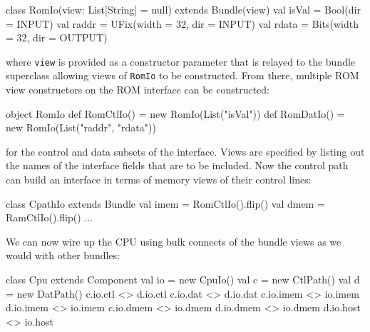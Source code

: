 \documentclass[twocolumn,10pt]{article}
\begin{document}
\begin{scala}
class RomIo(view: List[String] = null) extends Bundle(view) {
  val isVal = Bool(dir = INPUT)
  val raddr = UFix(width = 32, dir = INPUT)
  val rdata = Bits(width = 32, dir = OUTPUT)
}
\end{scala}

\noindent
where \verb+view+ is provided as a constructor parameter that is relayed to the bundle superclass allowing views of \verb+RomIo+ to be constructed.
From there, multiple ROM view constructors on the ROM interface can be constructed:

\begin{scala}
object RomIo {
  def RomCtlIo() = new RomIo(List("isVal"))
  def RomDatIo() = new RomIo(List("raddr", "rdata"))
}
\end{scala}

\noindent
for the control and data subsets of the interface.  
Views are specified by listing out the names of the interface fields that are to be included.  
Now the control path can build an interface in terms of memory views of their control lines:

\begin{scala}
class CpathIo extends Bundle {
  val imem = RomCtlIo().flip()
  val dmem = RamCtlIo().flip()
  ...
}
\end{scala}

\noindent
We can now wire up the CPU using bulk connects of the bundle views as we would with other bundles:

\begin{scala}
class Cpu extends Component {
  val io = new CpuIo()
  val c  = new CtlPath()
  val d  = new DatPath()
  c.io.ctl  <> d.io.ctl
  c.io.dat  <> d.io.dat
  c.io.imem <> io.imem
  d.io.imem <> io.imem
  c.io.dmem <> io.dmem
  d.io.dmem <> io.dmem
  d.io.host <> io.host
}
\end{scala}

%
%
%
%
%
\end{document}
